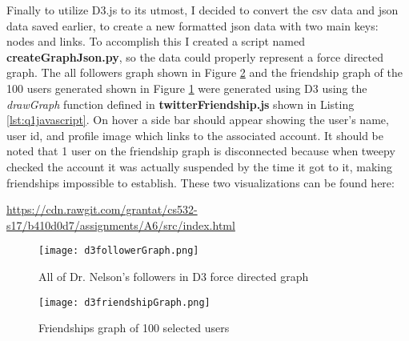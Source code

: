 \documentclass[letterpaper,11pt]{article}
\newcommand*{\srcPath}{../src}%
\begin{document}
Finally to utilize D3.js to its utmost, I decided to convert the csv data and json data saved earlier, to create a new formatted json data with two main keys: nodes and links. To accomplish this I created a script named \textbf{createGraphJson.py}, so the data could properly represent a force directed graph. The all followers graph shown in Figure \ref{fig:q1allfollwersgraph} and the friendship graph of the 100 users generated shown in Figure \ref{fig:q1friendshipgraph} were generated using D3 using the \textit{drawGraph} function defined in \textbf{twitterFriendship.js} shown in Listing \ref{lst:q1javascript}. On hover a side bar should appear showing the user's name, user id, and profile image which links to the associated account. It should be noted that 1 user on the friendship graph is disconnected because when tweepy checked the account it was actually suspended by the time it got to it, making friendships impossible to establish. These two visualizations can be found here:

\url{https://cdn.rawgit.com/grantat/cs532-s17/b410d0d7/assignments/A6/src/index.html}


\clearpage
 \begin{figure}[h]
 \centering
 \texttt{[image: d3followerGraph.png]}
 \caption{All of Dr. Nelson's followers in D3 force directed graph}
 \label{fig:q1friendshipgraph}
 \end{figure}

\clearpage
 \begin{figure}[h]
 \centering
 \texttt{[image: d3friendshipGraph.png]}
 \caption{Friendships graph of 100 selected users}
 \label{fig:q1allfollwersgraph}
 \end{figure}

 

 

 
\end{document}
